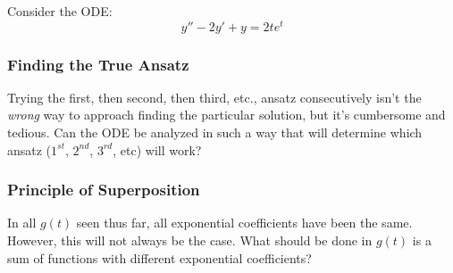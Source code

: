 \documentclass[12pt]{article}
\begin{document}
Consider the ODE:
\begin{equation*}
  y'' - 2y' + y = 2te^{t}
\end{equation*}

\subsubsection{Finding the True Ansatz}
\label{sssec:findingTheTrueAnsatz}

Trying the first, then second, then third, etc., ansatz consecutively isn't the \textit{wrong} way to approach finding the particular solution, but it's cumbersome and tedious. Can the ODE be analyzed in such a way that will determine which ansatz ($1^{st}$, $2^{nd}$, $3^{rd}$, etc) will work?

\subsubsection{Principle of Superposition}
\label{sssec:principleOfSuperpositionAnsatz}

In all $g(t)$ seen thus far, all exponential coefficients have been the same. However, this will not always be the case. What should be done in $g(t)$ is a sum of functions with different exponential coefficients?

%
%
\end{document}
